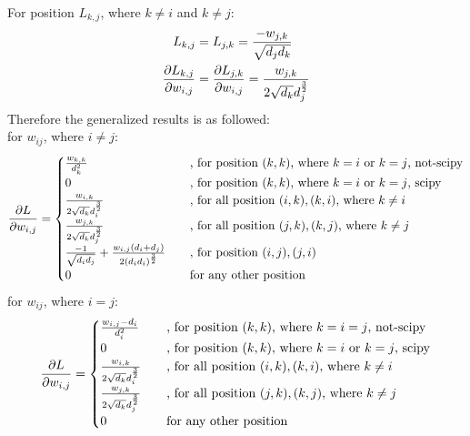 \documentclass[final]{siamltexmm}
\begin{document}
For position $L_{k,j}$, where $k \neq i$ and $k \neq j$:
\begin{equation}
\begin{aligned}
L_{k,j} &= L_{j,k} =  {-w_{j,k} \over \sqrt{d_jd_k}} \\
{\partial L_{k,j} \over \partial w_{i,j}} &= {\partial L_{j,k} \over \partial w_{i,j}} = {w_{j,k} \over 2\sqrt{d_k}d_j^{3\over2}}
\end{aligned}
\end{equation}
Therefore the generalized results is as followed:\\
for $w_{ij}$, where $i \neq j$:
\begin{equation}
{\partial L \over \partial w_{i,j}} =
\begin{cases}
  {w_{k,k}\over d_k^2}       & \quad \text{, for position $(k,k)$, where $k = i$ or $k = j$, not-scipy}\\
  0       & \quad \text{, for position $(k,k)$, where $k = i$ or $k = j$, scipy}\\
  {w_{i,k} \over 2\sqrt{d_k}d_i^{3\over2}}       & \quad \text{, for all position $(i,k), (k,i)$, where $k \neq i$}\\
  {w_{j,k} \over 2\sqrt{d_k}d_j^{3\over2}}       & \quad \text{, for all position $(j,k), (k,j)$, where $k \neq j$}\\
  {-1 \over \sqrt{d_id_j}} + {w_{i,j}(d_i+d_j) \over 2(d_id_i)^{3\over 2}}       & \quad \text{, for position $(i ,j), (j, i)$}\\
  0 & \quad \text{for any other position} \\
\end{cases}
\end{equation}
for $w_{ij}$, where $i = j$:
\begin{equation}
{\partial L \over \partial w_{i,j}} =
\begin{cases}
  {w_{i,j}-d_i \over d_i^2}       & \quad \text{, for position $(k,k)$, where $k = i = j$, not-scipy}\\
  0       & \quad \text{, for position $(k,k)$, where $k = i$ or $k = j$, scipy}\\
  {w_{i,k} \over 2\sqrt{d_k}d_i^{3\over2}}       & \quad \text{, for all position $(i,k), (k,i)$, where $k \neq i$}\\
  {w_{j,k} \over 2\sqrt{d_k}d_j^{3\over2}}       & \quad \text{, for all position $(j,k), (k,j)$, where $k \neq j$}\\
  0 & \quad \text{for any other position} \\
\end{cases}
\end{equation}
\end{document}
